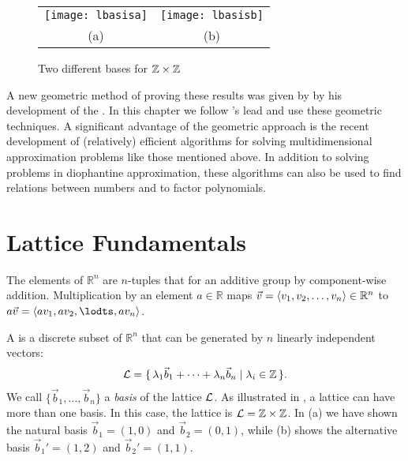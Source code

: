 \begin{figure}
\begin{center}\tabcolsep=2pc
 \begin{tabular}{cc}
  \texttt{[image: lbasisa]} 
   &
  \texttt{[image: lbasisb]} \\
  (a) & (b)
 \end{tabular}
\end{center}
\caption{Two different bases for ${\protect\mathbb{Z}} \times {\protect\mathbb{Z}}$
     \label{Lattice:Basis:Fig}}
\end{figure}

A new geometric method of proving these results was given by {\Minkowski}
by his development of the .  In this chapter
we follow {\Minkowski}'s lead and use these geometric techniques.  A
significant advantage of the geometric approach is the recent
development of (relatively) efficient algorithms for solving
multidimensional approximation problems like those mentioned above.
In addition to solving problems in diophantine approximation, these
algorithms can also be used to find relations between numbers and to
factor polynomials. 

\section{Lattice Fundamentals}
\label{Lattice:Fund:Sec}

The elements of $\mathbb{R}^{n}$ are $n$-tuples that for an additive group by 
component-wise addition. Multiplication by an element $a \in \mathbb{R}$ 
maps $\vec v = \langle v_1, v_2, \ldots, v_n \rangle \in \mathbb{R}^n$ to 
$a \vec v = \langle av_1, av_2, \lodts, a v_n \rangle$.

A  is a discrete subset of $\mathbb{R}^{n}$ that 
can be generated by $n$ linearly independent vectors: 
\begin{equation*}
{\cal L} = \{\, \lambda_{1} \vec b_{1} + \cdots + \lambda_{n} \vec b_{n} \mid
\lambda_{i} \in \mathbb{Z} \,\}.
\end{equation*}
We call $\{\vec b_{1}, \ldots, \vec b_{n}\}$ a {\em
basis} of the lattice ${\cal L}$.  As illustrated
in , a lattice can have more than one basis.
In this case, the lattice is ${\cal L} = \mathbb{Z} \times \mathbb{Z}$.  In
(a) we have shown the natural basis $\vec b_{1} =
(1, 0)$ and $\vec b_{2} = (0, 1)$, while (b)
shows the alternative basis $\vec b_{1}' = (1, 2)$ and $\vec b_{2}' = (1, 1)$.
 
